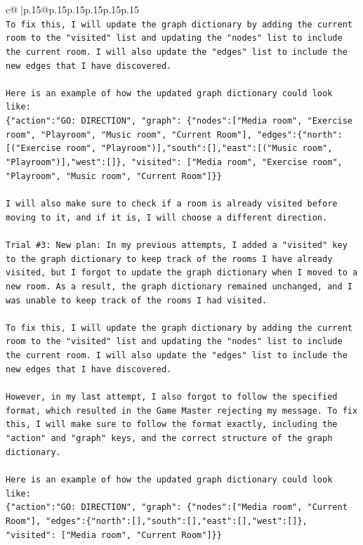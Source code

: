 \documentclass{article}
\begin{document}
{\begin{supertabular}{c@{$\;$}|p{.15\linewidth}@{}p{.15\linewidth}p{.15\linewidth}p{.15\linewidth}p{.15\linewidth}p{.15\linewidth}}
{{{\\ 
\texttt{To fix this, I will update the graph dictionary by adding the current room to the "visited" list and updating the "nodes" list to include the current room. I will also update the "edges" list to include the new edges that I have discovered.} \\
\\ 
\texttt{Here is an example of how the updated graph dictionary could look like:} \\
\texttt{\{"action":"GO: DIRECTION", "graph": \{"nodes":{[}"Media room", "Exercise room", "Playroom", "Music room", "Current Room"{]}, "edges":\{"north":{[}("Exercise room", "Playroom"){]},"south":{[}{]},"east":{[}("Music room", "Playroom"){]},"west":{[}{]}\}, "visited": {[}"Media room", "Exercise room", "Playroom", "Music room", "Current Room"{]}\}\}} \\
\\ 
\texttt{I will also make sure to check if a room is already visited before moving to it, and if it is, I will choose a different direction.} \\
\\ 
\texttt{Trial \#3: New plan: In my previous attempts, I added a "visited" key to the graph dictionary to keep track of the rooms I have already visited, but I forgot to update the graph dictionary when I moved to a new room. As a result, the graph dictionary remained unchanged, and I was unable to keep track of the rooms I had visited.} \\
\\ 
\texttt{To fix this, I will update the graph dictionary by adding the current room to the "visited" list and updating the "nodes" list to include the current room. I will also update the "edges" list to include the new edges that I have discovered.} \\
\\ 
\texttt{However, in my last attempt, I also forgot to follow the specified format, which resulted in the Game Master rejecting my message. To fix this, I will make sure to follow the format exactly, including the "action" and "graph" keys, and the correct structure of the graph dictionary.} \\
\\ 
\texttt{Here is an example of how the updated graph dictionary could look like:} \\
\texttt{\{"action":"GO: DIRECTION", "graph": \{"nodes":{[}"Media room", "Current Room"{]}, "edges":\{"north":{[}{]},"south":{[}{]},"east":{[}{]},"west":{[}{]}\}, "visited": {[}"Media room", "Current Room"{]}\}\}} \\
}}}
\end{supertabular}}
\end{document}
